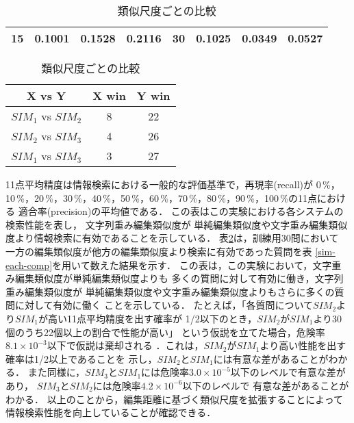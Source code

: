 \begin{table}[bht]
\begin{center}
\begin{tabular}{|c||c|c|c||c||c|c|c|}
15 & 0.1001 & 0.1528 & 0.2116 & 30 & 0.1025 & 0.0349 & 0.0527\\ \hline
\end{tabular}
\end{center}
\caption{類似尺度ごとの比較}
\label{sim-win-comp}
\begin{center}
\vspace*{-1em}
\begin{tabular}{|c||c|c|}\hline
{X vs Y}&{X win}&{Y win}\\\hline\hline
{$SIM_1$ vs $SIM_2$} & 8  & 22\\\hline
{$SIM_2$ vs $SIM_3$} & 4 & 26 \\\hline
{$SIM_1$ vs $SIM_3$} &  3 & 27 \\\hline
\end{tabular}
\end{center}
\vspace*{-1em}
\end{table}
11点平均精度は情報検索における一般的な評価基準で，再現率(recall)が
0\,\%，10\,\%，20\,\%，30\,\%，40\,\%，50\,\%，60\,\%，70\,\%，80\,\%，90\,\%，100\,\%の11点における
適合率(precision)の平均値である\cite{Manning99}．
この表はこの実験における各システムの検索性能を表し，
文字列重み編集類似度が
単純編集類似度や文字重み編集類似度より情報検索に有効であることを示している．
表\ref{sim-win-comp}は，訓練用30問において
一方の編集類似度が他方の編集類似度より検索に有効であった質問を表
\ref{sim-each-comp}を用いて数えた結果を示す．
この表は，この実験において，文字重み編集類似度が単純編集類似度よりも
多くの質問に対して有効に働き，文字列重み編集類似度が
単純編集類似度や文字重み編集類似度よりもさらに多くの質問に対して有効に働く
ことを示している．
たとえば，「各質問について$SIM_2$より$SIM_1$が高い11点平均精度を出す確率が
1/2以下のとき，$SIM_2$が$SIM_1$より30個のうち22個以上の割合で性能が高い」
という仮説を立てた場合，危険率$8.1 \times 10^{-3}$以下で仮説は棄却される
．これは，$SIM_2$が$SIM_1$より高い性能を出す確率は1/2以上であることを
示し，$SIM_2$と$SIM_1$には有意な差があることがわかる．
また同様に，$SIM_3$と$SIM_1$には危険率$3.0 \times
10^{-5}$以下のレベルで有意な差があり，
$SIM_3$と$SIM_2$には危険率$4.2 \times 10^{-6}$以下のレベルで
有意な差があることがわかる．
以上のことから，編集距離に基づく類似尺度を拡張することによって
情報検索性能を向上していることが確認できる．

